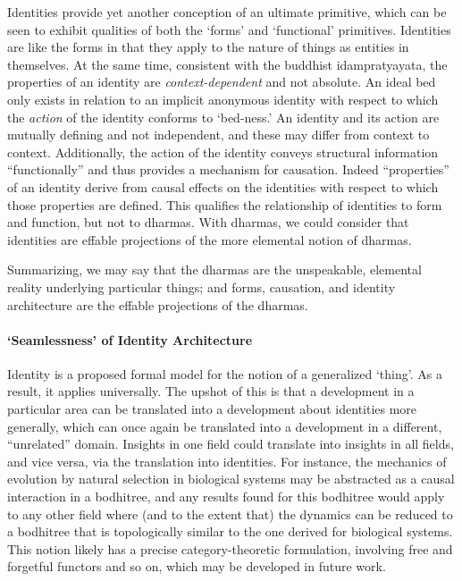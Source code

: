 \documentclass[pra,twocolumn,groupedaddress,10pt]{revtex4}
\theoremstyle{definition}
\begin{document}
Identities provide yet another conception of an ultimate primitive, which can be seen to exhibit qualities of both the `forms' and `functional' primitives. Identities are like the forms in that they apply to the nature of things as entities in themselves. At the same time, consistent with the buddhist idampratyayata, the properties of an identity are \emph{context-dependent} and not absolute. An ideal bed only exists in relation to an implicit anonymous identity with respect to which the \emph{action} of the identity conforms to `bed-ness.' An identity and its action are mutually defining and not independent, and these may differ from context to context. Additionally, the action of the identity conveys structural information ``functionally'' and thus provides a mechanism for causation. Indeed ``properties'' of an identity derive from causal effects on the identities with respect to which those properties are defined. This qualifies the relationship of identities to form and function, but not to dharmas. With dharmas, we could consider that identities are effable projections of the more elemental notion of dharmas.

Summarizing, we may say that the dharmas are the unspeakable, elemental reality underlying particular things; and forms, causation, and identity architecture are the effable projections of the dharmas.

\paragraph{`Seamlessness' of Identity Architecture} Identity is a proposed formal model for the notion of a generalized `thing'. As a result, it applies universally. The upshot of this is that a development in a particular area can be translated into a development about identities more generally, which can once again be translated into a development in a different, ``unrelated'' domain. Insights in one field could translate into insights in all fields, and vice versa, via the translation into identities. For instance, the mechanics of evolution by natural selection in biological systems may be abstracted as a causal interaction in a bodhitree, and any results found for this bodhitree would apply to any other field where (and to the extent that) the dynamics can be reduced to a bodhitree that is topologically similar to the one derived for biological systems. This notion likely has a precise category-theoretic formulation, involving free and forgetful functors and so on, which may be developed in future work.
\end{document}
